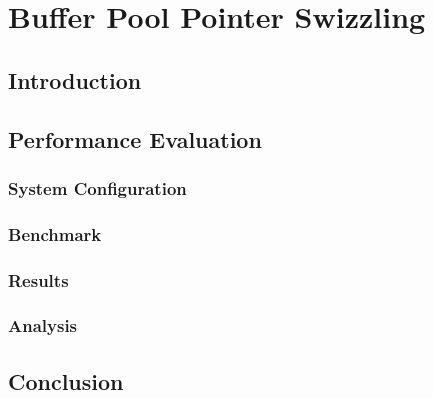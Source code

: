 \chapter{Buffer Pool Pointer Swizzling} \label{ch:pointer_swizzling}

\section{Introduction} \label{sec:pointer_swizzling_intro}

    

\section{Performance Evaluation} \label{sec:pointer_swizzling_performance_evaluation}

    

\subsection{System Configuration} \label{subsec:pointer_swizzling_system_configuration}

    

\subsection{Benchmark} \label{subsec:pointer_swizzling_benchmark}

    

\subsection{Results} \label{subsec:pointer_swizzling_results}

    

\subsection{Analysis} \label{subsec:pointer_swizzling_analysis}

    

\section{Conclusion} \label{sec:pointer_swizzling_outro}

    
